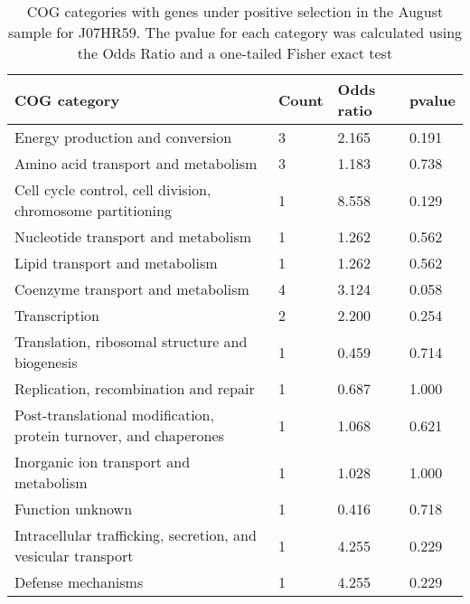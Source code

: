 \begin{table}[hb]
\footnotesize 
	\tabcolsep=0.11cm 
\caption{COG categories with genes under positive selection in the August sample for J07HR59. The pvalue for each category was calculated using the Odds Ratio and a one-tailed Fisher exact test \\} 
\begin{tabularx}{\textwidth}{L{6cm}R{2cm}R{2cm}R{2cm}} 
\hline 
\textbf{COG category} & \textbf{Count} & \textbf{Odds ratio} & \textbf{pvalue} \\ 
\hline 
Energy production and conversion & 3 & 2.165 & 0.191 \\ 
Amino acid transport and metabolism & 3 & 1.183 & 0.738 \\ 
Cell cycle control, cell division, chromosome partitioning & 1 & 8.558 & 0.129 \\ 
Nucleotide transport and metabolism & 1 & 1.262 & 0.562 \\ 
Lipid transport and metabolism & 1 & 1.262 & 0.562 \\ 
Coenzyme transport and metabolism & 4 & 3.124 & 0.058 \\ 
Transcription & 2 & 2.200 & 0.254 \\ 
Translation, ribosomal structure and biogenesis & 1 & 0.459 & 0.714 \\ 
Replication, recombination and repair & 1 & 0.687 & 1.000 \\ 
Post-translational modification, protein turnover, and chaperones & 1 & 1.068 & 0.621 \\ 
Inorganic ion transport and metabolism & 1 & 1.028 & 1.000 \\ 
Function unknown & 1 & 0.416 & 0.718 \\ 
Intracellular trafficking, secretion, and vesicular transport & 1 & 4.255 & 0.229 \\ 
Defense mechanisms & 1 & 4.255 & 0.229 \\ 
\end{tabularx} 
\label{August_COG_Selection_J07HR59} 
 \end{table} 

